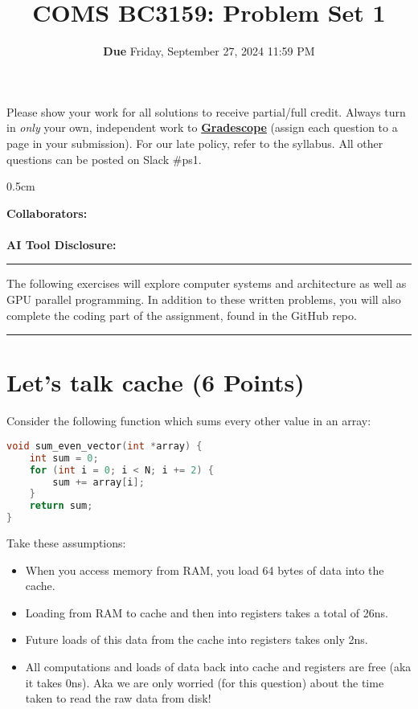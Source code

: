 \documentclass[]{article}
\title{\textbf{COMS BC3159:} Problem Set 1}
\author{\textbf{Due} Friday, September 27, 2024 11:59 PM\\
}
\date{}
\DeclareRobustCommand{\colorbox}[3][gray!10]{
  \begin{tcolorbox}[left=8pt, arc=0pt, outer arc=0pt, colframe=#1, colback=#1, coltext=black] #2 \end{tcolorbox}
}
\begin{document}
\maketitle

\colorbox {
Please show your work for all solutions to receive partial/full credit.  Always turn in \textit{only} your own, independent work to \href{https://www.gradescope.com/courses/820552}{\textbf{Gradescope}} (assign each question to a page in your submission).  For our late policy, refer to the syllabus.  All other questions can be posted on Slack \#ps1.
}

\vspace{0.5cm}

\textbf{Collaborators:}
\\ \\
\textbf{AI Tool Disclosure:}

\vspace{0.5cm}
\hrule
\vspace{0.5cm}
The following exercises will explore computer systems and architecture as well as GPU parallel programming. In addition to these written problems, you will also complete the coding part of the assignment, found in the GitHub repo. 
\vspace{0.5cm}
\hrule

\section{Let's talk cache (6 Points)}
Consider the following function which sums every other value in an array:
\begin{tcolorbox}[left=14pt, arc=0pt, outer arc=0pt, colframe=blue!5, colback=blue!5]
\begin{lstlisting}[language=C]
void sum_even_vector(int *array) {
    int sum = 0;
    for (int i = 0; i < N; i += 2) {
        sum += array[i];
    }
    return sum;
}
\end{lstlisting}
\end{tcolorbox}
Take these assumptions:
\begin{itemize}
    \item When you access memory from RAM, you load 64 bytes of data into the cache.
    \item Loading from RAM to cache and then into registers takes a total of 26ns.
    \item Future loads of this data from the cache into registers takes only 2ns.
    \item All computations and loads of data back into cache and registers are free (aka it takes 0ns). Aka we are only worried (for this question) about the time taken to read the raw data from disk!
\end{itemize}
\end{document}
